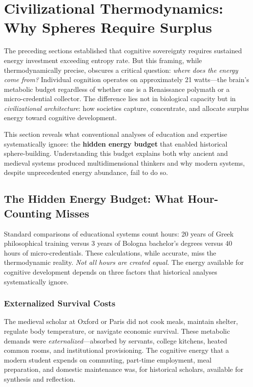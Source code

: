 \section{Civilizational Thermodynamics: Why Spheres Require Surplus}

The preceding sections established that cognitive sovereignty requires sustained energy investment exceeding entropy rate. But this framing, while thermodynamically precise, obscures a critical question: \textit{where does the energy come from?} Individual cognition operates on approximately 21 watts---the brain's metabolic budget regardless of whether one is a Renaissance polymath or a micro-credential collector. The difference lies not in biological capacity but in \textit{civilizational architecture}: how societies capture, concentrate, and allocate surplus energy toward cognitive development.

This section reveals what conventional analyses of education and expertise systematically ignore: the \textbf{hidden energy budget} that enabled historical sphere-building. Understanding this budget explains both why ancient and medieval systems produced multidimensional thinkers and why modern systems, despite unprecedented energy abundance, fail to do so.

\subsection{The Hidden Energy Budget: What Hour-Counting Misses}

Standard comparisons of educational systems count hours: 20 years of Greek philosophical training versus 3 years of Bologna bachelor's degrees versus 40 hours of micro-credentials. These calculations, while accurate, miss the thermodynamic reality. \textit{Not all hours are created equal.} The energy available for cognitive development depends on three factors that historical analyses systematically ignore.

\subsubsection{Externalized Survival Costs}

The medieval scholar at Oxford or Paris did not cook meals, maintain shelter, regulate body temperature, or navigate economic survival. These metabolic demands were \textit{externalized}---absorbed by servants, college kitchens, heated common rooms, and institutional provisioning. The cognitive energy that a modern student expends on commuting, part-time employment, meal preparation, and domestic maintenance was, for historical scholars, available for synthesis and reflection.

